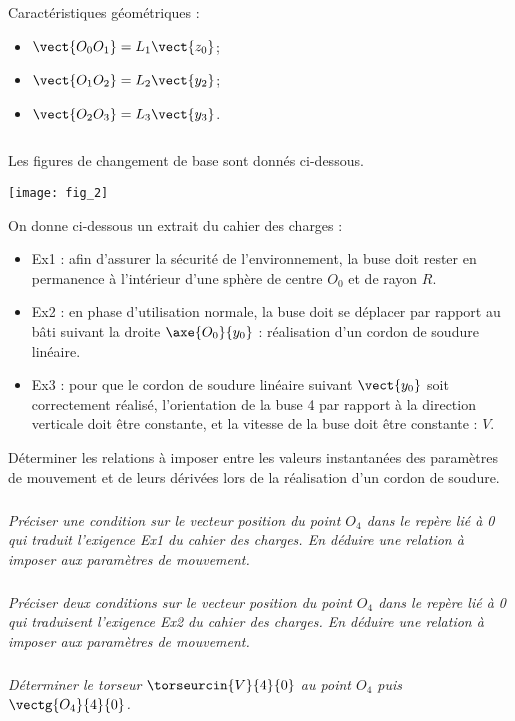 \begin{multicols}{2}
\begin{multicols}{2}
 \noindent  Caractéristiques géométriques :
\begin{itemize}
\item $\vect{O_0O_1} = L_1\vect{z_0}$;
\item $\vect{O_1O_2} = L_2\vect{y_2}$;
\item $\vect{O_2O_3} = L_3\vect{y_3}$.
\end{itemize}
$\quad$


\end{multicols}


Les figures de changement de base sont donnés ci-dessous.
\begin{center}
\texttt{[image: fig\_2]}
\end{center}

On donne ci-dessous un extrait du cahier des charges :

\begin{itemize}
\item Ex1 : afin d’assurer la sécurité de l’environnement, la buse doit rester en permanence à l’intérieur
d’une sphère de centre $O_0$ et de rayon $R$.
\item Ex2 : en phase d’utilisation normale, la buse doit se déplacer par rapport au bâti suivant la droite $\axe{O_0}{y_0}$ : réalisation d’un cordon de soudure linéaire.
\item Ex3 : pour que le cordon de soudure linéaire suivant $\vect{y_0}$ soit correctement réalisé, l’orientation de la
buse 4 par rapport à la direction verticale doit être constante, et la vitesse de la buse doit être 
constante : $V$.
\end{itemize}

\begin{obj}
Déterminer les relations à imposer entre les valeurs instantanées des paramètres de mouvement et
de leurs dérivées lors de la réalisation d’un cordon de soudure.
\end{obj}

\subparagraph{}
\textit{Préciser une condition sur le vecteur position du point $O_4$ dans le repère lié à 0 qui traduit l’exigence Ex1 du
cahier des charges. En déduire une relation à imposer aux paramètres de mouvement.}


\subparagraph{}
\textit{Préciser deux conditions sur le vecteur position du point $O_4$ dans le repère lié à 0 qui traduisent l’exigence Ex2 du
cahier des charges. En déduire une relation à imposer aux paramètres de mouvement.}


\subparagraph{}
\textit{Déterminer le torseur $\torseurcin{V}{4}{0}$ au point $O_4$ puis  $\vectg{O_4}{4}{0}$.}





\end{multicols}
